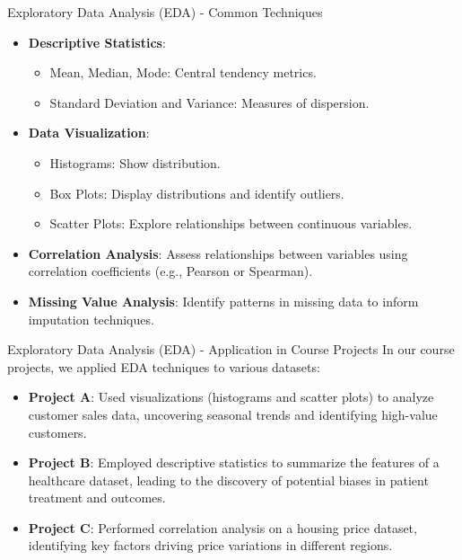 \documentclass[aspectratio=169]{beamer}
\begin{document}
\begin{frame}[fragile]{Exploratory Data Analysis (EDA) - Common Techniques}
    \begin{itemize}
        \item \textbf{Descriptive Statistics}:
            \begin{itemize}
                \item Mean, Median, Mode: Central tendency metrics.
                \item Standard Deviation and Variance: Measures of dispersion.
            \end{itemize}
        \item \textbf{Data Visualization}:
            \begin{itemize}
                \item Histograms: Show distribution.
                \item Box Plots: Display distributions and identify outliers.
                \item Scatter Plots: Explore relationships between continuous variables.
            \end{itemize}
        \item \textbf{Correlation Analysis}: Assess relationships between variables using correlation coefficients (e.g., Pearson or Spearman).
        \item \textbf{Missing Value Analysis}: Identify patterns in missing data to inform imputation techniques.
    \end{itemize}
\end{frame}

\begin{frame}[fragile]{Exploratory Data Analysis (EDA) - Application in Course Projects}
    In our course projects, we applied EDA techniques to various datasets:
    \begin{itemize}
        \item \textbf{Project A}: Used visualizations (histograms and scatter plots) to analyze customer sales data, uncovering seasonal trends and identifying high-value customers.
        \item \textbf{Project B}: Employed descriptive statistics to summarize the features of a healthcare dataset, leading to the discovery of potential biases in patient treatment and outcomes.
        \item \textbf{Project C}: Performed correlation analysis on a housing price dataset, identifying key factors driving price variations in different regions.
    \end{itemize}
\end{frame}
\end{document}
